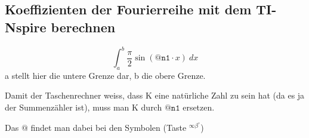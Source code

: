 \subsection{Koeffizienten der Fourierreihe mit dem TI-Nspire berechnen}
\[ \int_{\boxed{a}}^{\boxed{b}}\boxed{\frac{\pi}{2}\sin(\mathtt{@n1} \cdot x)}~d
\boxed{x} \]
a stellt hier die untere Grenze dar, b die obere Grenze.


Damit der Taschenrechner weiss, dass K eine natürliche Zahl zu sein hat (da es 
ja der Summenzähler ist), muss man K durch $\mathtt{@n1}$ ersetzen.


Das $\mathtt{@}$ findet man dabei bei den Symbolen 
(Taste $\boxed{\boxed{^{\infty \beta ^\circ}}}$)
\fi
